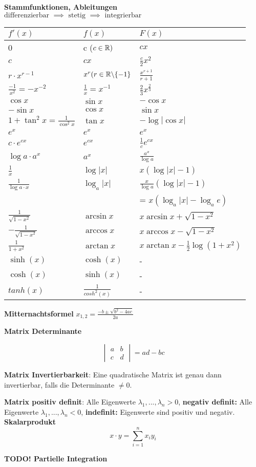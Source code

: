 \textbf{Stammfunktionen, Ableitungen}\\
$\text{differenzierbar }\implies\text{ stetig }\implies \text{ integrierbar}$\\
\begin{tabular}{l|l|l}
    $f'(x)$ & $f(x)$ & $F(x)$ \\[0.5em] \hline
    0 & c ($c\in\mathbb{R})$ & $cx$ \\[0.5em]
    $c$ & $cx$ &$\frac{c}{2}x^2$ \\[0.5em]
    $r\cdot x^{r-1}$ & $x^r (r\in \mathbb{R} \backslash \{-1\}$ & $\frac{x^{r+1}}{r+1}$ \\[0.5em]
    $\frac{-1}{x^2} = -x^{-2}$ & $\frac{1}{x}=x^{-1}$ & $\frac{2}{3}x^{\frac{2}{3}}$ \\[0.5em]
    $\cos x$ & $\sin x$  & $-\cos x$ \\[0.5em]
    $-\sin x$ & $\cos x$ & $\sin x$\\[0.5em]
    $1+\tan^2x = \frac{1}{\cos^2x}$ & $\tan x$ & $-\log|\cos x|$\\[0.5em]
    $e^x$ & $e^x$ & $e^x$\\[0.5em]
    $c\cdot e^{cx}$ & $e^{cx}$ & $\frac{1}{c}e^{cx}$\\[0.5em]
    $\log a \cdot a^x$ & $a^x$ & $\frac{a^x}{\log a}$\\[0.5em]
    $\frac{1}{x}$ & $\log|x|$ & $x(\log|x|-1)$ \\[0.5em]
    $\frac{1}{\log a\cdot x}$ & $\log_a |x|$ & $\frac{x}{\log a}(\log|x|-1)$\\[0.5em]
     & & = $x(\log_a|x|-\log_ae)$\\[0.5em]
    $\frac{1}{\sqrt{1-x^2}}$ & $\arcsin x$ & $x\arcsin x + \sqrt{1-x^2}$\\[0.5em]
    $-\frac{1}{\sqrt{1-x^2}}$ & $\arccos x$ &  $x\arccos x - \sqrt{1-x^2}$\\[0.5em]
    $\frac{1}{1+x^2}$ & $\arctan x$ & $x\arctan x - \frac{1}{2}\log(1+x^2)$\\
    $\sinh(x)$ & $\cosh(x)$ & - \\
    $\cosh(x)$ & $\sinh(x)$ & -\\
    $tanh(x)$ & $\frac{1}{cosh^2(x)}$ & -
\end{tabular}

\textbf{Mitternachtsformel}
$x_{1, 2} = \frac{-b \pm \sqrt{b^2 - 4ac}}{2a}$

\textbf{Matrix Determinante}

\[
    \begin{vmatrix}
        a & b\\
        c & d
    \end{vmatrix} = ad-bc
\]

\textbf{Matrix Invertierbarkeit}: Eine quadratische Matrix ist genau dann invertierbar, falls die Determinante $\neq 0$.

\textbf{Matrix positiv definit}: Alle Eigenwerte $\lambda_1, ..., \lambda_n > 0$, \textbf{negativ definit:} Alle Eigenwerte $\lambda_1, ..., \lambda_n < 0$, \textbf{indefinit:} Eigenwerte sind positiv und negativ.\\

\textbf{Skalarprodukt} \[ x \cdot y = \sum_{i=1}^n x_i y_i \]

\textbf{TODO! Partielle Integration}